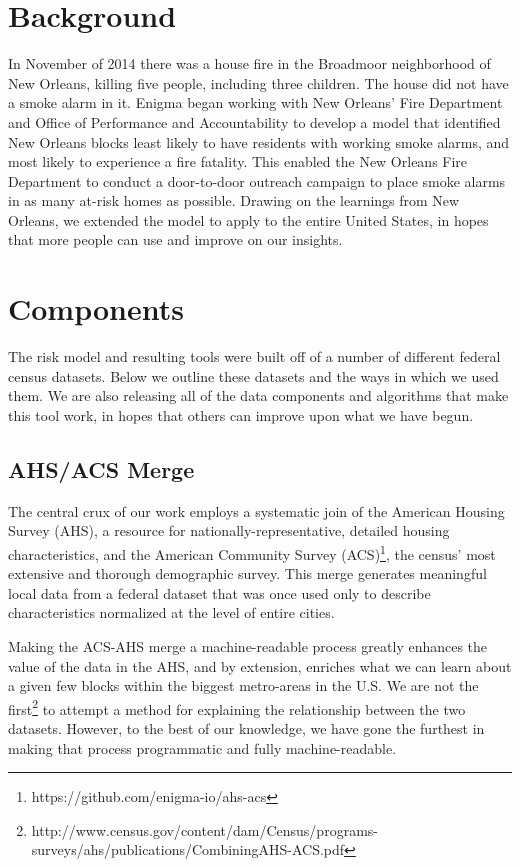 \documentclass{sig-alternate}
\begin{document}
\section{Background}

In November of 2014 there was a house fire in the Broadmoor neighborhood of New Orleans, killing five people, including three children. The house did not have a smoke alarm in it. Enigma began working with New Orleans' Fire Department and Office of Performance and Accountability to develop a model that identified New Orleans blocks least likely to have residents with working smoke alarms, and most likely to experience a fire fatality. This enabled the New Orleans Fire Department to conduct a door-to-door outreach campaign to place smoke alarms in as many at-risk homes as possible. Drawing on the learnings from New Orleans, we extended the model to apply to the entire United States, in hopes that more people can use and improve on our insights.


\section{Components}

The risk model and resulting tools were built off of a number of different federal census datasets. Below we outline these datasets and the ways in which we used them. We are also releasing all of the data components and algorithms that make this tool work, in hopes that others can improve upon what we have begun.

\subsection{AHS/ACS Merge}

The central crux of our work employs a systematic join of the American Housing Survey (AHS), a resource for nationally-representative, detailed housing characteristics, and the American Community Survey (ACS)\footnote{https://github.com/enigma-io/ahs-acs}, the census' most extensive and thorough demographic survey. This merge generates meaningful local data from a federal dataset that was once used only to describe characteristics normalized at the level of entire cities.

Making the ACS-AHS merge a machine-readable process greatly enhances the value of the data in the AHS, and by extension, enriches what we can learn about a given few blocks within the biggest metro-areas in the U.S. We are not the first\footnote{http://www.census.gov/content/dam/Census/programs-surveys/ahs/publications/CombiningAHS-ACS.pdf} to attempt a method for explaining the relationship between the two datasets. However, to the best of our knowledge, we have gone the furthest in making that process programmatic and fully machine-readable.
\end{document}
